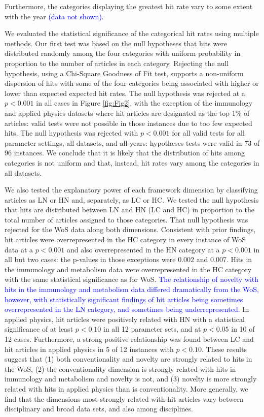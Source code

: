 \documentclass[NETN]{stjour}
\begin{document}
Furthermore, the categories displaying the greatest hit rate vary  to some extent with the year \textcolor{blue}{(data not shown)}.

We evaluated the statistical significance of the categorical hit rates using multiple methods.  Our first test was based on the null hypotheses that hits were distributed randomly among the four categories with uniform probability in proportion to the number of articles in each category. Rejecting the null hypothesis, using a Chi-Square Goodness of Fit test, supports a non-uniform dispersion of hits with some of the four categories being associated with higher or lower than expected expected hit rates. The null hypothesis was rejected at a $p<0.001$ in all cases in  Figure \ref{fig:Fig2}, with the exception of the immunology and applied physics datasets where hit articles are designated as the top 1\% of articles: valid tests were not possible in those instances due to too few expected hits. The null hypothesis was rejected with $p<0.001$ for all valid tests for all parameter settings, all datasets, and all years: hypotheses tests were valid in 73 of 96 instances. We conclude that it is likely that the distribution of hits among categories is not uniform and that, instead, hit rates vary among the categories in all datasets. 

We also tested the explanatory power of each framework dimension by classifying articles as LN or HN and, separately, as LC or HC. We tested the null hypothesis that hits are distributed between LN and HN (LC and HC) in proportion to the total number of articles assigned to those categories.  That null hypothesis was rejected for the WoS data along both dimensions. Consistent with prior findings, hit articles were overrepresented in the HC category in every instance of WoS data at a $p<0.001$ and also overrepresented in the HN category at a $p<0.001$ in all but two cases: the p-values in those exceptions were $0.002$ and $0.007$.  Hits in the immunology and metabolism data were overrepresented in the HC category with the same statistical significance as for WoS. \textcolor{blue}{The relationship of novelty with hits in the immunology and metabolism data differed dramatically from the WoS, however, with statistically significant findings of hit articles being sometimes overrepresented in the LN category, and sometimes being underrepresented.}  In applied physics, hit articles were positively related with HN with a statistical significance of at least $p<0.10$ in all 12 parameter sets, and at $p<0.05$ in 10 of 12 cases.  Furthermore, a strong positive relationship was found between LC and hit articles in applied physics in 5 of 12 instances with $p<0.10$. These results suggest that (1) both conventionality and novelty are strongly related to hits in the WoS, (2) the conventionality dimension is strongly related with hits in immunology and metabolism and novelty is not, and (3) novelty is more strongly related with hits in applied physics than is conventionality. More generally, we find that the dimensions most strongly related with hit articles vary between disciplinary and broad data sets, and also among disciplines. 
\end{document}
